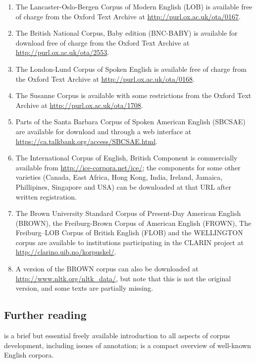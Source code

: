 \begin{enumerate}\sloppy
  \item The Lancaster-Oslo-Bergen Corpus of Modern English (LOB) is available free of charge from the Oxford Text Archive at \url{http://purl.ox.ac.uk/ota/0167}.
  \item The British National Corpus, Baby edition (BNC-BABY) is available for download free of charge from the Oxford Text Archive at \url{http://purl.ox.ac.uk/ota/2553}.
  \item The London-Lund Corpus of Spoken English is available free of charge from the Oxford Text Archive at \url{http://purl.ox.ac.uk/ota/0168}.
  \item The Susanne Corpus is available with some restrictions from the Oxford Text Archive at \url{http://purl.ox.ac.uk/ota/1708}.
  \item Parts of the Santa Barbara Corpus of Spoken American English (SBCSAE) are available for download and through a web interface at \url{https://ca.talkbank.org/access/SBCSAE.html}.
  \item The International Corpus of English, British Component is commercially available from \url{http://ice-corpora.net/ice/}; the components for some other varieties (Canada, East Africa, Hong Kong, India, Ireland, Jamaica, Phillipines, Singapore and USA) can be downloaded at that URL after written registration.
  \item The Brown University Standard Corpus of Present-Day American English (BROWN), the Freiburg-Brown Corpus of American English (FROWN), The Freiburg–LOB Corpus of British English (FLOB) and the WELLINGTON corpus are available to institutions participating in the CLARIN project at \url{http://clarino.uib.no/korpuskel/}.
  \item A version of the BROWN corpus can also be downloaded at \url{http://www.nltk.org/nltk_data/}, but note that this is not the original version, and some texts are partially missing.
\end{enumerate}

\subsection*{Further reading}

\citet{wynne_developing_2005} is a brief but essential freely available introduction to all aspects of corpus development, including issues of annotation; \citet{ludeling_well-known_2008} is a compact overview of well-known English corpora.


